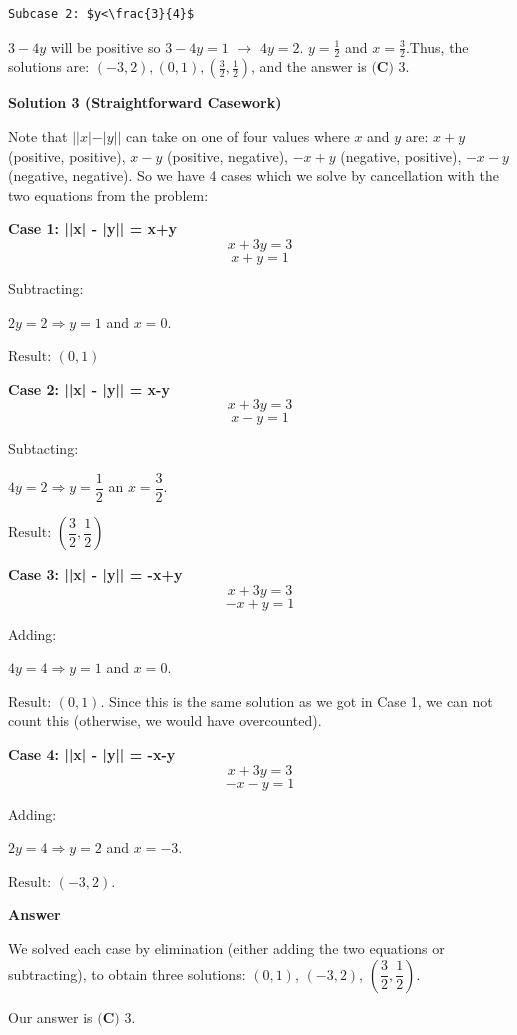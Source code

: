 \begin{enumerate}
 \begin{verbatim}
Subcase 2: $y<\frac{3}{4}$
\end{verbatim}

$3-4y$ will be positive so $3-4y = 1$ $\rightarrow$ $4y = 2$. $y = \frac{1}{2}$ and $x = \frac{3}{2}$.Thus, the solutions are: $(-3,2), (0,1), \left(\frac{3}{2},\frac{1}{2} \right)$, and the answer is $\boxed{\textbf{(C) } 3}$.

 



\textbf{Solution 3 (Straightforward Casework)}

Note that $||x| - |y||$ can take on one of four values where $x$ and $y$ are: $x + y$ (positive, positive), $x - y$ (positive, negative), $-x + y$ (negative, positive), $-x -y$ (negative, negative). So we have 4 cases which we solve by cancellation with the two equations from the problem:

 \textbf{Case 1: ||x| - |y|| = x+y  }
 \[x+3y=3\]
 \[x+y=1\]

 Subtracting:

 $2y=2 \Rightarrow y=1$ and $x=0$.

 $\text{Result: } (0,1)$

 
\textbf{Case 2: ||x| - |y|| = x-y}
 \[x+3y=3\]
 \[x-y=1\]

 Subtacting:

 $4y=2 \Rightarrow y=\dfrac{1}{2}$ an $x=\dfrac{3}{2}$.

 $\text{Result: } \left(\dfrac{3}{2},\dfrac{1}{2}\right)$

 
\textbf{Case 3: ||x| - |y|| = -x+y}
 \[x+3y=3\]
 \[-x+y=1\]

 Adding: 

 $4y=4 \Rightarrow y=1$ and $x=0$.

 
$\text{Result: } (0,1)$. Since this is the same solution as we got in Case 1, we can not count this (otherwise, we would have overcounted).

 
\textbf{Case 4: ||x| - |y|| = -x-y}
 \[x+3y=3\]
 \[-x-y=1\]

 Adding: 

 $2y=4 \Rightarrow y=2$ and $x=-3$.

 
$\text{Result: } (-3,2)$.

 
\textbf{Answer}

 We solved each case by elimination (either adding the two equations or subtracting), to obtain three solutions: $(0, 1)$, $(-3,2)$, $\left(\dfrac{3}{2}, \dfrac{1}{2}\right)$.

 Our answer is $\boxed{\textbf{(C) } 3}$.


\end{enumerate}
